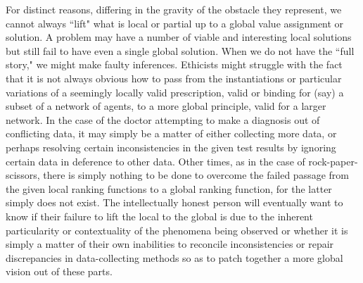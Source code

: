 \documentclass[11pt]{book}
\theoremstyle{definition}
\theoremstyle{definition}
\theoremstyle{definition}
\theoremstyle{theorem}
\theoremstyle{definition}
\begin{document}
	For distinct reasons, differing in the gravity of the obstacle they represent, we cannot always ``lift" what is local or partial up to a global value assignment or solution. A problem may have a number of viable and interesting local solutions but still fail to have even a single global solution. When we do not have the ``full story," we might make faulty inferences. Ethicists might struggle with the fact that it is not always obvious how to pass from the instantiations or particular variations of a seemingly locally valid prescription, valid or binding for (say) a subset of a network of agents, to a more global principle, valid for a larger network. In the case of the doctor attempting to make a diagnosis out of conflicting data, it may simply be a matter of either collecting more data, or perhaps resolving certain inconsistencies in the given test results by ignoring certain data in deference to other data. Other times, as in the case of rock-paper-scissors, there is simply nothing to be done to overcome the failed passage from the given local ranking functions to a global ranking function, for the latter simply does not exist. The intellectually honest person will eventually want to know if their failure to lift the local to the global is due to the inherent particularity or contextuality of the phenomena being observed or whether it is simply a matter of their own inabilities to reconcile inconsistencies or repair discrepancies in data-collecting methods so as to patch together a more global vision out of these parts. \par 
\end{document}
